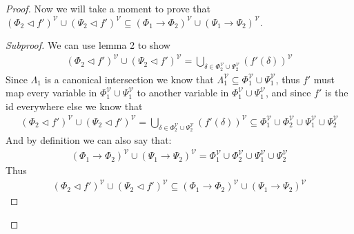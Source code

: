 \documentclass{article}
\newenvironment{subproof}{%
  \begin{proof}[Subproof]%
}{%
  \end{proof}%
}
\begin{document}
\begin{proof}
Now we will take a moment to prove that $(\Phi_2\lhd f')^\mathcal{V}\cup(\Psi_2\lhd f')^\mathcal{V} \subseteq (\Phi_1\rightarrow\Phi_2)^\mathcal{V} \cup (\Psi_1\rightarrow\Psi_2)^\mathcal{V}$.
\begin{subproof}
We can use lemma 2 to show
\begin{align*}
(\Phi_2\lhd f')^\mathcal{V}\cup(\Psi_2\lhd f')^\mathcal{V}
= \bigcup_{\delta \in \Phi_2^\mathcal{V}\cup\Psi_2^\mathcal{V}}(f'(\delta))^\mathcal{V}
\end{align*}
Since $\Lambda_1$ is a canonical intersection we know that $\Lambda_1^\mathcal{V} \subseteq \Phi_1^\mathcal{V}\cup\Psi_1^\mathcal{V}$, thus $f'$ must map every variable in $\Phi_1^\mathcal{V}\cup\Psi_1^\mathcal{V}$ to another variable in $\Phi_1^\mathcal{V}\cup\Psi_1^\mathcal{V}$, and since $f'$ is the id everywhere else we know that
\begin{align*}
(\Phi_2\lhd f')^\mathcal{V}\cup(\Psi_2\lhd f')^\mathcal{V}
= \bigcup_{\delta \in \Phi_2^\mathcal{V}\cup\Psi_2^\mathcal{V}}(f'(\delta))^\mathcal{V}
\subseteq \Phi_1^\mathcal{V}\cup\Phi_2^\mathcal{V} \cup \Psi_1^\mathcal{V}\cup\Psi_2^\mathcal{V}
\end{align*}
And by definition we can also say that:
\begin{align*}
(\Phi_1\rightarrow\Phi_2)^\mathcal{V} \cup (\Psi_1\rightarrow\Psi_2)^\mathcal{V}
= \Phi_1^\mathcal{V}\cup\Phi_2^\mathcal{V} \cup \Psi_1^\mathcal{V}\cup\Psi_2^\mathcal{V}
\end{align*}
Thus
\begin{align*}
(\Phi_2\lhd f')^\mathcal{V}\cup(\Psi_2\lhd f')^\mathcal{V} \subseteq (\Phi_1\rightarrow\Phi_2)^\mathcal{V} \cup (\Psi_1\rightarrow\Psi_2)^\mathcal{V}
\end{align*}
\end{subproof}


\end{proof}
\end{document}
